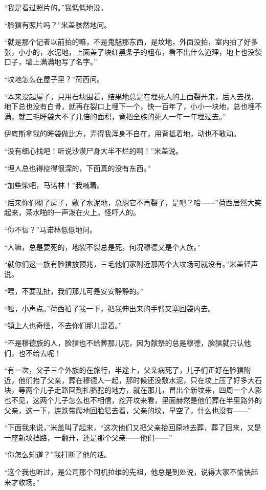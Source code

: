 \par “我是看过照片的。”我低低地说。
\par “脸狺有照片吗？”米盖骇然地问。
\par “就是那个记者以前拍的嘛，不是鬼魅那东西，是坟地，外面没拍，室内拍了好多张，小小的，水泥地，上面盖了块红黑条子的粗布，看不出什么道理，地上也没裂口子，墙上满满地写了名字。”
\par “坟地怎么在屋子里？”荷西问。
\par “本来没起屋子，只用石块围着，结果地总是在埋死人的上面裂开来，后人去找，地下总也没有白骨，就再在裂口上埋下一个，快一百年了，小小一块地，总也埋不满，就三毛睡袋大不了几倍的面积，竟把全族的死人一年一年埋过去。”
\par 伊底斯拿我的睡袋做比方，弄得我浑身不自在，用背抵着地，动也不敢动。
\par “没有细心找吧！听说沙漠尸身大半不烂的啊！”米盖说。
\par “埋人总也得挖得很深的，下面真的没有东西。”
\par “加些柴吧，马诺林！”我喊着。
\par “后来你们砌了房子，敷了水泥地，总想它不再裂了，是吧？哈——”荷西居然大笑起来，茶水啪的一声泼在火上。怪吓人的。
\par “你不信？”马诺林低低地问。
\par “人嘛，总是要死的，地裂不裂总是死，何况穆德又是个大族。”
\par “就你们这一族有脸狺放预兆，三毛他们家附近那两个大坟场可就没有。”米盖轻声说。
\par “喂，不要乱扯，我们那儿可是安安静静的。”
\par “嘘，小声点。”荷西拍了我一下，把我伸出来的手臂又塞回袋内去。
\par “镇上人也奇怪，不去你们那儿混着。”
\par “不是穆德族的人，脸狺也不给葬那儿呢，因为献祭的总是穆德，脸狺就只认他们，也不给去呢！
\par “有一次，父子三个外族的在旅行，半途上，父亲病死了，儿子们正好在脸狺附近，他们抬了父亲，葬在穆德人一起，那时候还没敷水泥，只在坟上压了好多大石块，等两个儿子走路回到扎骆驼的地方，就在那儿，冒出个新坟来，四周一个人影也不见，这两个儿子怎么也不相信，挖开坟来看，里面赫然是他们葬在半里路外的父亲，这一下，连跌带爬地回脸狺去看，父亲的坟，早空了，什么也没有——”
\par “下面我来说，”米盖叫了起来，“这次他们又把父亲抬回原地去葬，葬了回来，又是一座新坟挡路，一翻开，还是那个父亲——他们——”
\par “你怎么知道？”我打断了他的话。
\par “这个我也听过，是公司那个司机拉维的先祖，他总是到处说，说得大家不愉快起来才收场。”
